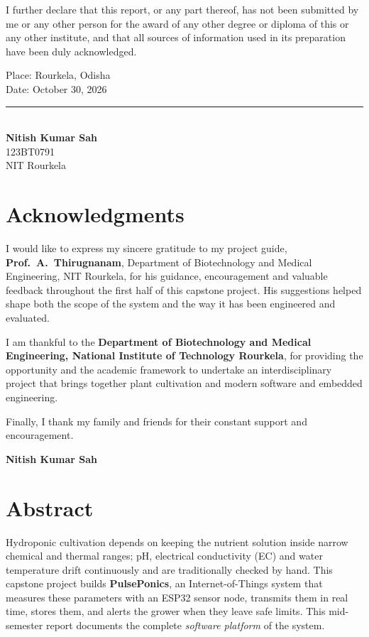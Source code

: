 \documentclass[11pt,a4paper,oneside]{report}
\begin{document}
I further declare that this report, or any part thereof, has not been submitted by me
or any other person for the award of any other degree or diploma of this or any other
institute, and that all sources of information used in its preparation have been duly
acknowledged.

\vspace{2.2cm}
\noindent
\begin{minipage}[t]{0.48\linewidth}
Place: Rourkela, Odisha\\
Date: October 30, 2026
\end{minipage}\hfill
\begin{minipage}[t]{0.40\linewidth}\raggedleft
\rule{4.5cm}{0.4pt}\\
\textbf{Nitish Kumar Sah}\\
123BT0791\\
NIT Rourkela
\end{minipage}
\clearpage

\chapter*{Acknowledgments}
I would like to express my sincere gratitude to my project guide,
\textbf{Prof.\ A.\ Thirugnanam}, Department of Biotechnology and Medical Engineering,
NIT Rourkela, for his guidance, encouragement and valuable feedback throughout the
first half of this capstone project. His suggestions helped shape both the scope of the
system and the way it has been engineered and evaluated.

I am thankful to the \textbf{Department of Biotechnology and Medical Engineering,
National Institute of Technology Rourkela}, for providing the opportunity and the
academic framework to undertake an interdisciplinary project that brings together
plant cultivation and modern software and embedded engineering.

Finally, I thank my family and friends for their constant support and encouragement.

\vspace{1cm}
\hfill \textbf{Nitish Kumar Sah}
\clearpage

\chapter*{Abstract}
Hydroponic cultivation depends on keeping the nutrient solution inside narrow
chemical and thermal ranges; pH, electrical conductivity (EC) and water temperature
drift continuously and are traditionally checked by hand. This capstone project builds
\textbf{PulsePonics}, an Internet-of-Things system that measures these parameters with
an ESP32 sensor node, transmits them in real time, stores them, and alerts the grower
when they leave safe limits. This mid-semester report documents the complete
\emph{software platform} of the system.
\end{document}
